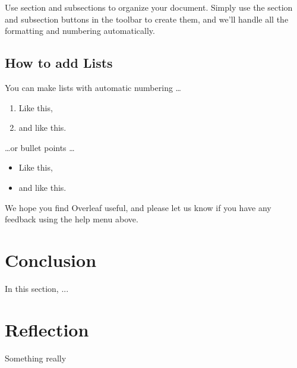 \documentclass[a4paper]{article}
\begin{document}
Use section and subsections to organize your document. Simply use the section and subsection buttons in the toolbar to create them, and we'll handle all the formatting and numbering automatically.

\subsection{How to add Lists}

You can make lists with automatic numbering \dots

\begin{enumerate}
\item Like this,
\item and like this.
\end{enumerate}
\dots or bullet points \dots
\begin{itemize}
\item Like this,
\item and like this.
\end{itemize}

We hope you find Overleaf useful, and please let us know if you have any feedback using the help menu above.


\section{Conclusion}
\label{sec:conclusion}
In this section, ...


\section{Reflection}
\label{sec:reflection}
Something really \cite{Mohri_2012}



\end{document}
